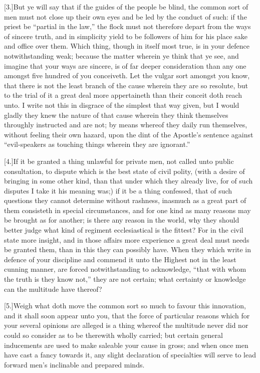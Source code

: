 [3.]But ye will say that if the guides of the people be blind, the common sort of men must not close up their own eyes and be led by the conduct of such: if the priest be “partial in the law,” the flock must not therefore depart from the ways of sincere truth, and in simplicity yield to be followers of him for his place sake and office over them. Which thing, though in itself most true, is in your defence notwithstanding weak; because the matter wherein ye think that ye see, and imagine that your ways are sincere, is of far deeper consideration than any one amongst five hundred of you conceiveth. Let the vulgar sort amongst you know, that there is not the least branch of the cause wherein they are so resolute, but to the trial of it a great deal more appertaineth than their conceit doth reach unto. I write not this in disgrace of the simplest that way given, but I would gladly they knew the nature of that cause wherein they think themselves throughly instructed and are not; by means whereof they daily run themselves, without feeling their own hazard, upon the dint of the Apostle’s sentence against “evil-speakers as touching things wherein they are ignorant.”

[4.]If it be granted a thing unlawful for private men, not called unto public consultation, to dispute which is the best state of civil polity, (with a desire of bringing in some other kind, than that under which they already live, for of such disputes I take it his meaning was;) if it be a thing confessed, that of such questions they cannot determine without rashness, inasmuch as a great part of them consisteth in special circumstances, and for one kind as many reasons may be brought as for another; is there any reason in the world, why they should better judge what kind of regiment ecclesiastical is the fittest? For in the civil state more insight, and in those affairs more experience a great deal must needs be granted them, than in this they can possibly have. When they which write in defence of your discipline and commend it unto the Highest not in the least cunning manner, are forced notwithstanding to acknowledge, “that with whom the truth is they know not,” they are not certain; what certainty or knowledge can the multitude have thereof?

[5.]Weigh what doth move the common sort so much to favour this innovation, and it shall soon appear unto you, that the force of particular reasons which for your several opinions are alleged is a thing whereof the multitude never did nor could so consider as to be therewith wholly carried; but certain general inducements are used to make saleable your cause in gross; and when once men have cast a fancy towards it, any slight declaration of specialties will serve to lead forward men’s inclinable and prepared minds.

